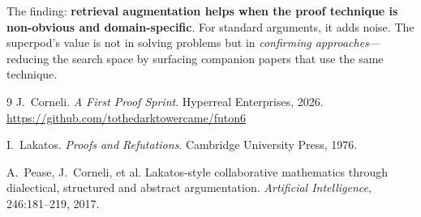 \documentclass[12pt,oneside]{book}
\theoremstyle{plain}
\theoremstyle{definition}
\theoremstyle{remark}
\begin{document}
The finding: \textbf{retrieval augmentation helps when the proof
technique is non-obvious and domain-specific}. For standard arguments,
it adds noise. The superpod's value is not in solving problems but in
\emph{confirming approaches}---reducing the search space by surfacing
companion papers that use the same technique.

\begin{thebibliography}{9}
  J.~Corneli. \emph{A First Proof Sprint}. Hyperreal Enterprises, 2026.
  \url{https://github.com/tothedarktowercame/futon6}

  I.~Lakatos. \emph{Proofs and Refutations}. Cambridge University Press, 1976.

  A.~Pease, J.~Corneli, et al.
  Lakatos-style collaborative mathematics through dialectical, structured
  and abstract argumentation.
  \emph{Artificial Intelligence}, 246:181--219, 2017.
\end{thebibliography}
\end{document}
